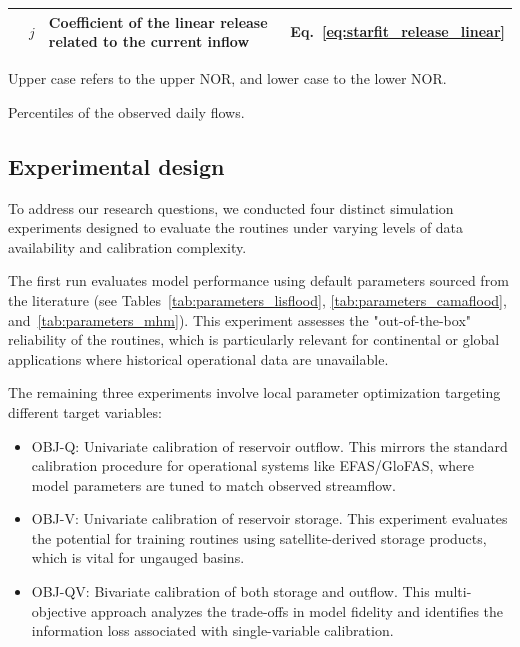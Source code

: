 \documentclass[hess, manuscript]{copernicus}
\newcommand{\calV}{OBJ-V}
\newcommand{\calQ}{OBJ-Q}
\newcommand{\calQV}{OBJ-QV}
\begin{document}
\begin{table}[t]
\begin{threeparttable}
\begin{tabularx}{\textwidth}{llXl}
                             & $j$ & Coefficient of the linear release related to the current inflow & Eq.~\ref{eq:starfit_release_linear} \\
             \bottomrule
        \end{tabularx}
        \begin{tablenotes}
            \small
            \item[*] Upper case refers to the upper NOR, and lower case to the lower NOR.
            \item[**] Percentiles of the observed daily flows.
        \end{tablenotes}
    \end{threeparttable}
\end{table}

\subsection{Experimental design}
\label{sec:experimental_design}

To address our research questions, we conducted four distinct simulation experiments designed to evaluate the routines under varying levels of data availability and calibration complexity.

The first run evaluates model performance using default parameters sourced from the literature (see Tables~\ref{tab:parameters_lisflood}, \ref{tab:parameters_camaflood}, and~\ref{tab:parameters_mhm}). This experiment assesses the "out-of-the-box" reliability of the routines, which is particularly relevant for continental or global applications where historical operational data are unavailable.

The remaining three experiments involve local parameter optimization targeting different target variables:
\begin{itemize} 
    \item \calQ: Univariate calibration of reservoir outflow. This mirrors the standard calibration procedure for operational systems like EFAS/GloFAS, where model parameters are tuned to match observed streamflow. 
    \item \calV: Univariate calibration of reservoir storage. This experiment evaluates the potential for training routines using satellite-derived storage products, which is vital for ungauged basins. 
    \item \calQV: Bivariate calibration of both storage and outflow. This multi-objective approach analyzes the trade-offs in model fidelity and identifies the information loss associated with single-variable calibration. 
\end{itemize}
\end{document}
